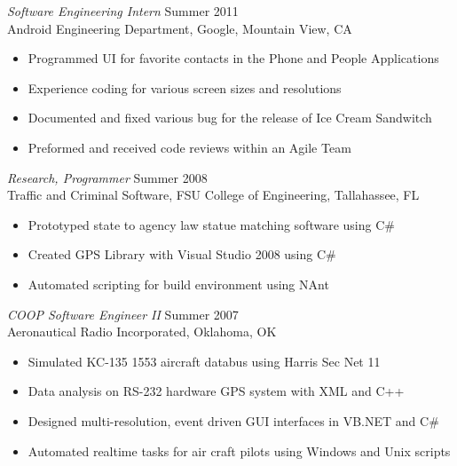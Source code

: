 \documentclass[margin]{res}
\begin{document}
\begin{resume}
{\sl Software Engineering Intern} \hfill     Summer 2011 \\
Android Engineering Department, Google, Mountain View, CA
\begin{itemize} \itemsep -5pt
\item Programmed UI for favorite contacts in the Phone and People Applications
\item Experience coding for various screen sizes and resolutions 
\item Documented and fixed various bug for the release of Ice Cream Sandwitch
\item Preformed and received code reviews within an Agile Team
\end{itemize}

{\sl Research, Programmer} \hfill            Summer 2008 \\
Traffic and Criminal Software, FSU College of Engineering, Tallahassee, FL
\begin{itemize}  \itemsep -5pt %
\item Prototyped state to agency law statue matching software using C\#
\item Created GPS Library with Visual Studio 2008 using C\#
\item Automated scripting for build environment using NAnt
\end{itemize} 

{\sl COOP Software Engineer II} \hfill        Summer 2007 \\
Aeronautical Radio Incorporated, Oklahoma, OK
\begin{itemize} \itemsep -5pt %
\item Simulated KC-135 1553 aircraft databus using Harris Sec Net 11
\item Data analysis on RS-232 hardware GPS system with XML and C++
\item Designed multi-resolution, event driven GUI interfaces in VB.NET and C\#
\item Automated realtime tasks for air craft pilots using Windows and Unix scripts
\end{itemize} 
 

\end{resume}
\end{document}
